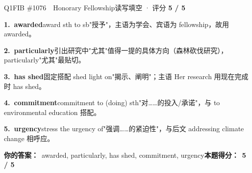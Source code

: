 \begin{qblock}{Q1\quad FIB \#1076\ \ Honorary Fellowship}{读写填空 · 评分 \textcolor{cAccent}{\bfseries 5 / 5}}
\begin{notebox}\footnotesize
\textbf{1.\ awarded}\quad award sth to sb"授予"，主语为学会、宾语为 fellowship，故用 awarded。\par\smallskip
\textbf{2.\ particularly}\quad 引出研究中"尤其"值得一提的具体方向（森林砍伐研究），particularly"尤其"最贴切。\par\smallskip
\textbf{3.\ has shed}\quad 固定搭配 shed light on"揭示、阐明"；主语 Her research 用现在完成时 has shed。\par\smallskip
\textbf{4.\ commitment}\quad commitment to (doing) sth"对……的投入/承诺"，与 to environmental education 搭配。\par\smallskip
\textbf{5.\ urgency}\quad stress the urgency of"强调……的紧迫性"，与后文 addressing climate change 相呼应。
\end{notebox}
\smallskip
\textbf{你的答案：}\ awarded, particularly, has shed, commitment, urgency\qquad\textbf{本题得分：}\ {\color{cAccent}\bfseries 5 / 5}
\end{qblock}

